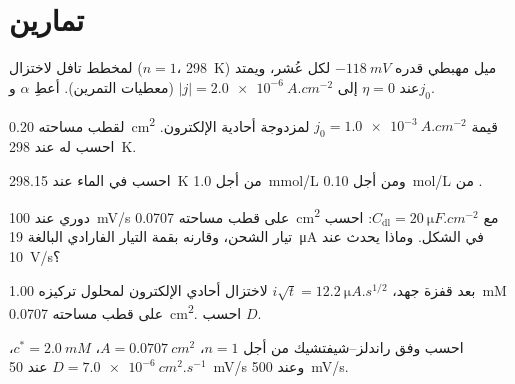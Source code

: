 \section{تمارين}

\begin{exercise}[$\star$]\label{exo:b3:electrode-kinetics:1}
لمخطط تافل لاختزال ($n = 1$، \qty{298}{K}) ميل مهبطي قدره $-\qty{118}{mV}$
لكل عُشر، ويمتد عند $\eta = 0$ إلى $|j| = \qty{2.0e-6}{A.cm^{-2}}$ (معطيات التمرين).
أعطِ $\alpha$ و$j_0$.
\end{exercise}

\begin{exercise}[$\star$]\label{exo:b3:electrode-kinetics:2}
لقطب مساحته \qty{0.20}{cm^2} قيمة $j_0 = \qty{1.0e-3}{A.cm^{-2}}$ لمزدوجة أحادية الإلكترون.
احسب  له عند \qty{298}{K}.
\end{exercise}

\begin{exercise}[$\star$]\label{exo:b3:electrode-kinetics:3}
احسب  في الماء عند \qty{298.15}{K} من أجل \qty{1.0}{mmol/L} ومن أجل \qty{0.10}{mol/L}
من .
\end{exercise}

\begin{exercise}[$\star$]\label{exo:b3:electrode-kinetics:4}
 دوري عند \qty{100}{mV/s} على قطب مساحته \qty{0.0707}{cm^2} مع $C_{\mathrm{dl}} =
\qty{20}{\micro F.cm^{-2}}$: احسب تيار الشحن، وقارنه بقمة التيار الفارادي البالغة
\qty{19}{\micro A} في الشكل. وماذا يحدث عند \qty{10}{V/s}؟
\end{exercise}

\begin{exercise}[$\star\star$]\label{exo:b3:electrode-kinetics:5}
بعد قفزة جهد، $i\sqrt t = \qty{12.2}{\micro A.s^{1/2}}$ لاختزال أحادي الإلكترون لمحلول
تركيزه \qty{1.00}{mM} على قطب مساحته \qty{0.0707}{cm^2}. احسب $D$.
\end{exercise}

\begin{exercise}[$\star\star$]\label{exo:b3:electrode-kinetics:6}
احسب  وفق راندلز--شيفتشيك من أجل $n = 1$، $A = \qty{0.0707}{cm^2}$، $c^* = \qty{2.0}{mM}$،
$D = \qty{7.0e-6}{cm^2.s^{-1}}$ عند \qty{50}{mV/s} وعند \qty{500}{mV/s}.
\end{exercise}

